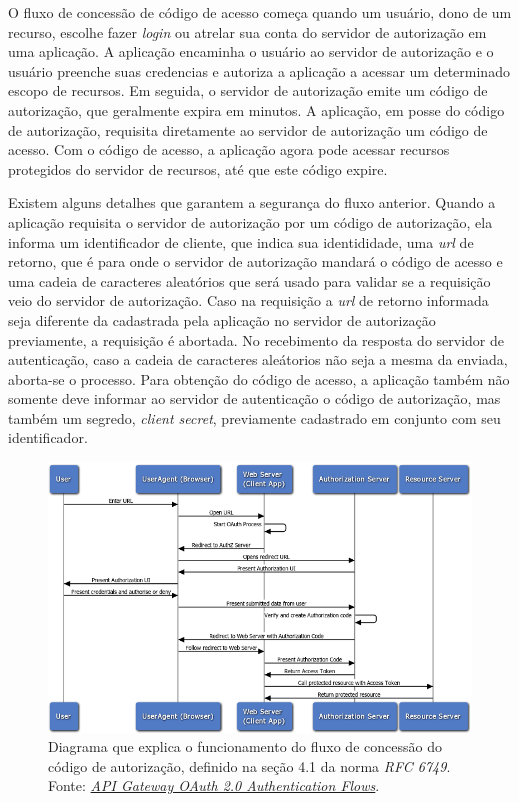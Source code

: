   O fluxo de concessão de código de acesso começa quando um usuário, dono de um recurso, escolhe 
  fazer \emph{login} ou atrelar sua conta do servidor de autorização em uma aplicação. A aplicação 
  encaminha o usuário ao servidor de autorização e o usuário preenche suas credencias  
  e autoriza a aplicação a acessar um determinado 
  escopo de recursos. Em seguida, o servidor de autorização emite um código de autorização, 
  que geralmente expira em minutos. A aplicação, em posse do código de autorização, requisita 
  diretamente ao servidor de autorização um código de acesso. Com o código de acesso, a aplicação agora 
  pode acessar recursos protegidos do servidor de recursos, até que este código expire.

  Existem alguns detalhes que garantem a segurança do fluxo anterior. Quando a aplicação requisita 
  o servidor de autorização por um código de autorização, ela informa um identificador de cliente, que 
  indica sua identididade, uma \emph{url} de retorno, que é para onde o servidor de autorização mandará 
  o código de acesso e uma cadeia de caracteres aleatórios que será usado para validar se a requisição 
  veio do servidor de autorização. Caso na requisição a \emph{url} de retorno informada seja diferente 
  da cadastrada pela aplicação no servidor de autorização previamente, a requisição é abortada. No 
  recebimento da resposta do servidor de autenticação, caso a cadeia de caracteres aleátorios não seja a mesma 
  da enviada, aborta-se o processo. Para obtenção do código de acesso, a aplicação também não somente deve informar 
  ao servidor de autenticação o código de autorização, mas também um segredo, \emph{client secret},
  previamente cadastrado em conjunto 
  com seu identificador.
  \begin{figure}[htpb]
    \centering
    \includegraphics[width=0.95\linewidth]{images/web_flow.png}
    \caption{Diagrama que explica o funcionamento do fluxo de concessão do código de autorização, 
      definido na seção 4.1 da norma \emph{RFC 6749}. Fonte: \hyperref[link:oauth]{\emph{API Gateway OAuth 2.0 Authentication Flows}}.}%
    \label{fig:web_flow}
  \end{figure}
  

